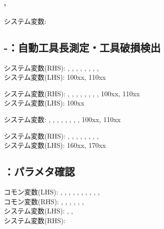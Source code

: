 \paragraph*{, }
システム変数: 

\subsection{-：自動工具長測定・工具破損検出}
\begin{hosoku}\small
システム変数(RHS): , , , , , , , , \\
システム変数(LHS): \ttNum100xx, \ttNum110xx
\end{hosoku}

\begin{hosoku}\small
システム変数(RHS): , , , , , , , , \ttNum100xx, \ttNum110xx\\
システム変数(LHS): \ttNum100xx
\end{hosoku}

\begin{hosoku}\small
システム変数: , , , , , , , , \ttNum100xx, \ttNum110xx
\end{hosoku}

\begin{hosoku}\small
システム変数(RHS): , , , , , , , , \\
システム変数(LHS): \ttNum160xx, \ttNum170xx
\end{hosoku}

\subsection{：パラメタ確認}
\begin{hosoku}\small
コモン変数(LHS): , , , , , , , , , , \\
コモン変数(RHS): , , , , , , \\
システム変数(LHS): , , \\
システム変数(RHS): 
\end{hosoku}

